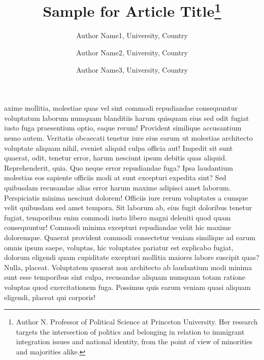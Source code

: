 \documentclass[autowc]{CUP-JNL-PPS}
\begin{document}
\begin{Frontmatter}
\title[Article Title]{Sample for Article Title\thanks{Author N.  Professor of Political Science at Princeton University. Her
research targets the intersection of politics and belonging in
relation to immigrant integration issues and national identity, from the point of view of minorities and majorities alike.
}}

\author{Author Name1, University, Country}
\author{Author Name2, University, Country}
\author{Author Name3, University, Country}


\end{Frontmatter}


axime mollitia, molestiae quas vel sint commodi repudiandae consequuntur voluptatum laborum
numquam blanditiis harum quisquam eius sed odit fugiat iusto fuga praesentium
optio, eaque rerum! Provident similique accusantium nemo autem. Veritatis
obcaecati tenetur iure eius earum ut molestias architecto voluptate aliquam
nihil, eveniet aliquid culpa officia aut! Impedit sit sunt quaerat, odit,
tenetur error, harum nesciunt ipsum debitis quas aliquid. Reprehenderit,
quia. Quo neque error repudiandae fuga? Ipsa laudantium molestias eos
sapiente officiis modi at sunt excepturi expedita sint? Sed quibusdam
recusandae alias error harum maxime adipisci amet laborum. Perspiciatis
minima nesciunt dolorem! Officiis iure rerum voluptates a cumque velit
quibusdam sed amet tempora. Sit laborum ab, eius fugit doloribus tenetur
fugiat, temporibus enim commodi iusto libero magni deleniti quod quam
consequuntur! Commodi minima excepturi repudiandae velit hic maxime
doloremque. Quaerat provident commodi consectetur veniam similique ad
earum omnis ipsum saepe, voluptas, hic voluptates pariatur est explicabo
fugiat, dolorum eligendi quam cupiditate excepturi mollitia maiores labore
suscipit quas? Nulla, placeat. Voluptatem quaerat non architecto ab laudantium
modi minima sunt esse temporibus sint culpa, recusandae aliquam numquam
totam ratione voluptas quod exercitationem fuga. Possimus quis earum veniam
quasi aliquam eligendi, placeat qui corporis!
\end{document}
